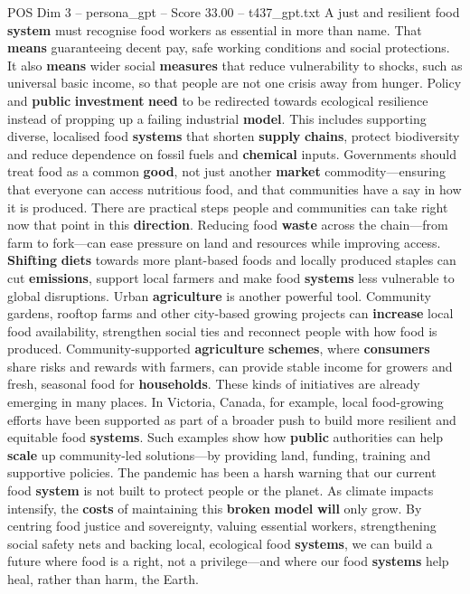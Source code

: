 \begin{textsample}{POS Dim 3 – persona\_gpt – Score 33.00 – t437\_gpt.txt}
A just and resilient food \textbf{system} must recognise food workers as essential in more than name.
That \textbf{means} guaranteeing decent pay, safe working conditions and social protections.
It also \textbf{means} wider social \textbf{measures} that reduce vulnerability to shocks, such as universal basic income, so that people are not one crisis away from hunger.
Policy and \textbf{public} \textbf{investment} \textbf{need} to be redirected towards ecological resilience instead of propping up a failing industrial \textbf{model}.
This includes supporting diverse, localised food \textbf{systems} that shorten \textbf{supply} \textbf{chains}, protect biodiversity and reduce dependence on fossil fuels and \textbf{chemical} inputs.
Governments should treat food as a common \textbf{good}, not just another \textbf{market} commodity—ensuring that everyone can access nutritious food, and that communities have a say in how it is produced.
There are practical steps people and communities can take right now that point in this \textbf{direction}.
Reducing food \textbf{waste} across the chain—from farm to fork—can ease pressure on land and resources while improving access. \textbf{Shifting} \textbf{diets} towards more plant-based foods and locally produced staples can cut \textbf{emissions}, support local farmers and make food \textbf{systems} less vulnerable to global disruptions.
Urban \textbf{agriculture} is another powerful tool.
Community gardens, rooftop farms and other city-based growing projects can \textbf{increase} local food availability, strengthen social ties and reconnect people with how food is produced.
Community-supported \textbf{agriculture} \textbf{schemes}, where \textbf{consumers} share risks and rewards with farmers, can provide stable income for growers and fresh, seasonal food for \textbf{households}.
These kinds of initiatives are already emerging in many places.
In Victoria, Canada, for example, local food-growing efforts have been supported as part of a broader push to build more resilient and equitable food \textbf{systems}.
Such examples show how \textbf{public} authorities can help \textbf{scale} up community-led solutions—by providing land, funding, training and supportive policies.
The pandemic has been a harsh warning that our current food \textbf{system} is not built to protect people or the planet.
As climate impacts intensify, the \textbf{costs} of maintaining this \textbf{broken} \textbf{model} \textbf{will} only grow.
By centring food justice and sovereignty, valuing essential workers, strengthening social safety nets and backing local, ecological food \textbf{systems}, we can build a future where food is a right, not a privilege—and where our food \textbf{systems} help heal, rather than harm, the Earth.

\end{textsample}
